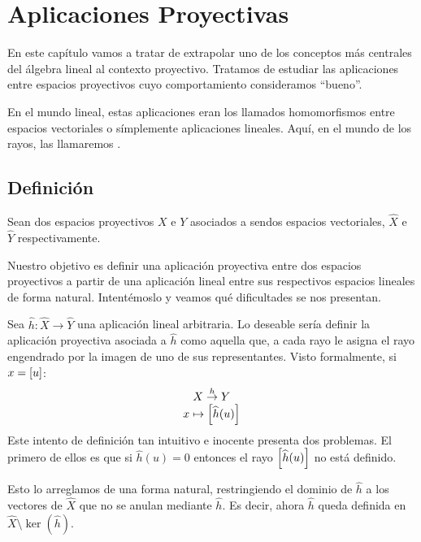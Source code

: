 \chapter{Aplicaciones Proyectivas}
\label{C4}
En este capítulo vamos a tratar de extrapolar uno de los conceptos más centrales del álgebra lineal al contexto proyectivo. Tratamos de estudiar las aplicaciones entre espacios proyectivos cuyo comportamiento consideramos ``bueno''.

En el mundo lineal, estas aplicaciones eran los llamados homomorfismos entre espacios vectoriales o símplemente aplicaciones lineales. Aquí, en el mundo de los rayos, las llamaremos .
\section{Definición}
\label{C4_definicion}
Sean dos espacios proyectivos $X$ e $Y$ asociados a sendos espacios vectoriales, $\widehat{X}$ e $\widehat{Y}$ respectivamente.

Nuestro objetivo es definir una aplicación proyectiva entre dos espacios proyectivos a partir de una aplicación lineal entre sus respectivos espacios lineales de forma natural. Intentémoslo y veamos qué dificultades se nos presentan.

Sea $\widehat{h}:\widehat{X}\to\widehat{Y}$ una aplicación lineal arbitraria. Lo deseable sería definir la aplicación proyectiva asociada a $\widehat{h}$ como aquella que, a cada rayo le asigna el rayo engendrado por la imagen de uno de sus representantes. Visto formalmente, si $x=\left [ u \right ]$:
\[\begin{array}{c}
X\stackrel{h}{\to}Y\\
x\mapsto\left [ \widehat{h}(u) \right ]
\end{array}\]
Este intento de definición tan intuitivo e inocente presenta dos problemas. El primero de ellos es que si $\widehat{h}(u)=0$ entonces el rayo $\left [ \widehat{h}(u) \right ]$ no está definido.

Esto lo arreglamos de una forma natural, restringiendo el dominio de $\widehat{h}$ a los vectores de $\widehat{X}$ que no se anulan mediante $\widehat{h}$. Es decir, ahora $\widehat{h}$ queda definida en $\widehat{X}\setminus \ker\left(\widehat{h}\right)$.

